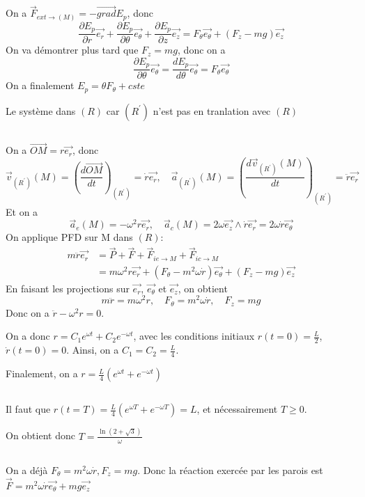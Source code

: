 \documentclass[a4paper,12pt]{book}
\begin{document}
On a $\vec{F}_{ext \to (M)}=-\overrightarrow{grad}E_p$, donc 
$$
\frac{\partial E_p}{\partial r}\vec{e_r}+\frac{\partial E_p}{\partial \theta}\vec{e_\theta}+\frac{\partial E_p}{\partial z}\vec{e_z}=F_\theta\vec{e_\theta}+(F_z-mg)\vec{e_z}
$$
On va démontrer plus tard que $F_z=mg$, donc on a 
$$
\frac{\partial E_p}{\partial \theta}\vec{e_\theta}=\frac{d E_p}{d \theta}\vec{e_\theta}=F_\theta\vec{e_\theta}
$$
On a finalement $\boxed{E_p=\theta F_\theta+cste}$

Le système  dans $(R)$ car $(R^{'})$ n'est pas en tranlation avec $(R)$

\subsection{}
On a $\overrightarrow{OM}=r\vec{e_r}$, donc 
$$
\vec{v}_{(R^{'})}(M)=\left(\frac{d\overrightarrow{OM}}{dt}\right)_{(R^{'})}=\dot{r}\vec{e_r}, \quad 
\vec{a}_{(R^{'})}(M)=\left(\frac{d\vec{v}_{(R^{'})}(M)}{dt}\right)_{(R^{'})}=\ddot{r}\vec{e_r} 
$$
Et on a 
$$
\vec{a}_e(M)=-\omega^2r\vec{e_r}, \quad \vec{a}_c(M)=2\omega\vec{e_z} \wedge \dot{r}\vec{e_r}=2\omega \dot{r}\vec{e_\theta}
$$
On applique PFD sur M dans $(R)$: 
\begin{align*}
m\ddot{r}\vec{e_r}&=\vec{P}+\vec{F}+\vec{F}_{ie \to M}+\vec{F}_{ic \to M}\\
&=m\omega^2r\vec{e_r}+(F_\theta-m^2\omega\dot{r})\vec{e_\theta}+(F_z-mg)\vec{e_z}
\end{align*}
En faisant les projections sur $\vec{e_r}$, $\vec{e_\theta}$ et $\vec{e_z}$, on obtient 
$$
m\ddot{r}=m\omega^2r, \quad F_\theta=m^2\omega\dot{r}, \quad F_z=mg
$$
Donc on a $\boxed{\ddot{r}-\omega^2r=0}$. 

On a donc $r=C_1 e^{\omega t}+C_2 e^{-\omega t}$, avec les conditions initiaux $r(t=0)=\frac{L}{2}$, $\dot{r}(t=0)=0$. 
Ainsi, on a $C_1=C_2=\frac{L}{4}$. 

Finalement, on a $\boxed{r=\frac{L}{4}(e^{\omega t}+e^{-\omega t})}$

\subsection{}
Il faut que $r(t=T)=\frac{L}{4}(e^{\omega T}+e^{-\omega T})=L$, et nécessairement $T\geq 0$. 

On obtient donc $\boxed{T=\frac{\ln(2+\sqrt{3})}{\omega}}$
\subsection{}
On a déjà $F_\theta=m^2\omega\dot{r}, F_z=mg$. Donc la réaction exercée par les parois 
est $\boxed{\vec{F}=m^2\omega\dot{r}\vec{e_\theta}+mg\vec{e_z}}$
\end{document}

